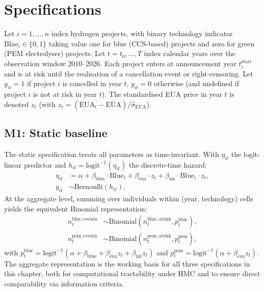 \documentclass[11pt,a4paper]{article}
\newcommand{\bint}{\beta_{\mathrm{int}}}
\newcommand{\bblue}{\beta_{\mathrm{blue}}}
\newcommand{\beua}{\beta_{\mathrm{eua}}}
\begin{document}
\section{Specifications}
\label{sec:ch7-spec}

Let $i = 1, \dots, n$ index hydrogen projects, with binary technology indicator $\mathrm{Blue}_i \in \{0,1\}$ taking value one for blue (CCS-based) projects and zero for green (PEM electrolyser) projects. Let $t = t_0, \dots, T$ index calendar years over the observation window 2010--2026. Each project enters at announcement year $t_i^{\mathrm{start}}$ and is at risk until the realisation of a cancellation event or right-censoring. Let $y_{it} = 1$ if project $i$ is cancelled in year $t$, $y_{it} = 0$ otherwise (and undefined if project $i$ is not at risk in year $t$). The standardised EUA price in year $t$ is denoted $z_t$ (with $z_t = (\mathrm{EUA}_t - \bar{\mathrm{EUA}})/\hat\sigma_{\mathrm{EUA}}$).

\subsection{M1: Static baseline}

The static specification treats all parameters as time-invariant. With $\eta_{it}$ the logit-linear predictor and $h_{it} = \mathrm{logit}^{-1}(\eta_{it})$ the discrete-time hazard:
\begin{align}
\eta_{it} &= \alpha + \bblue \cdot \mathrm{Blue}_i + \beua \cdot z_t + \bint \cdot \mathrm{Blue}_i \cdot z_t, \\
y_{it} &\sim \mathrm{Bernoulli}(h_{it}).
\end{align}
At the aggregate level, summing over individuals within (year, technology) cells yields the equivalent Binomial representation:
\begin{align}
n_{t}^{\mathrm{blue,events}} &\sim \mathrm{Binomial}(n_{t}^{\mathrm{blue,atrisk}}, p_{t}^{\mathrm{blue}}), \\
n_{t}^{\mathrm{pem,events}} &\sim \mathrm{Binomial}(n_{t}^{\mathrm{pem,atrisk}}, p_{t}^{\mathrm{pem}}),
\end{align}
with $p_t^{\mathrm{blue}} = \mathrm{logit}^{-1}(\alpha + \bblue + \beua z_t + \bint z_t)$ and $p_t^{\mathrm{pem}} = \mathrm{logit}^{-1}(\alpha + \beua z_t)$. The aggregate representation is the working basis for all three specifications in this chapter, both for computational tractability under HMC and to ensure direct comparability via information criteria.
\end{document}
